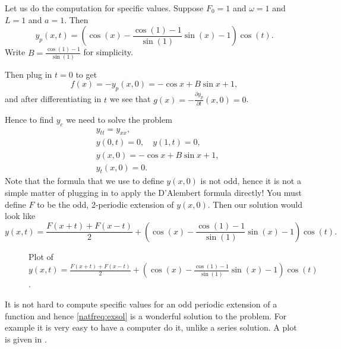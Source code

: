 \documentclass[12pt]{book}
\begin{document}
\begin{example}
Let us do the computation for specific values.
Suppose $F_0 = 1$ and $\omega = 1$ and $L=1$ and $a=1$.  Then 
\begin{equation*}
y_p(x,t) =
\left(
\cos (x) -
\frac{\cos (1) - 1}{\sin (1)}
\sin (x)
-1
\right)
\cos (t) .
\end{equation*}
Write $B = \frac{\cos (1) - 1}{\sin (1)}$ for simplicity.

Then plug in $t=0$ to get
\begin{equation*}
f(x) =- y_p(x,0) = 
- \cos x +
B \sin x
+1 ,
\end{equation*}
and after differentiating in $t$ we see that 
$g(x) = -\frac{\partial y_p}{\partial t}(x,0) = 0$.

Hence to find $y_c$ we need to solve the problem
\begin{align*}
& y_{tt} = y_{xx} , \\
& y(0,t) = 0 , \quad y(1,t) = 0 , \\
& y(x,0) = - \cos x + B \sin x +1 , \\
& y_t(x,0) = 0 .
\end{align*}
Note that the formula that we use to define $y(x,0)$ is not odd,
hence it is not a simple matter of plugging in to apply the D'Alembert
formula directly!  You must define $F$ to be the odd, 2-periodic
extension of $y(x,0)$.  Then our solution would look like
\begin{equation} \label{natfreq:exsol}
y(x,t) = 
\frac{F(x+t) + F(x-t)}{2} + 
\left(
\cos (x) -
\frac{\cos (1) - 1}{\sin (1)}
\sin (x)
-1
\right)
\cos (t) .
\end{equation}

\begin{figure}[h!t]
\capstart
\begin{center}
\caption[Plot of $y(x,t)$.]{Plot of $y(x,t) = \frac{F(x+t) + F(x-t)}{2} + \left( \cos (x) -
\frac{\cos (1) - 1}{\sin (1)} \sin (x) -1 \right) \cos (t)$.%
\label{natfreq:forcedvibfig}}
\end{center}
\end{figure}

It is not hard to compute specific values
for an odd periodic extension of a function and
hence \eqref{natfreq:exsol} is a wonderful solution to the problem.
For example it is very easy to have a computer do it, unlike a series solution.
A plot is given in .
\end{example}
\end{document}
